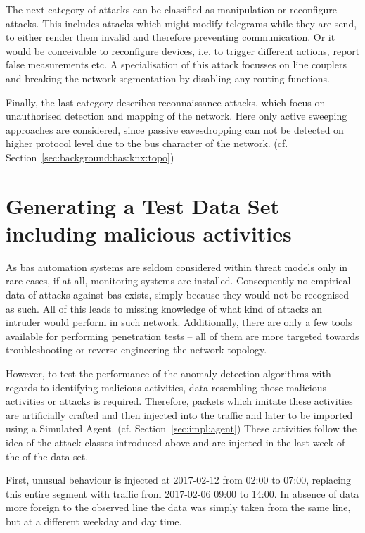 The next category of attacks can be classified as manipulation or reconfigure attacks. This includes attacks which might modify telegrams while they are send, to either render them invalid and therefore preventing communication. Or it would be conceivable to reconfigure devices, i.e. to trigger different actions, report false measurements etc. A specialisation of this attack focusses on line couplers and breaking the network segmentation by disabling any routing functions.

Finally, the last category describes reconnaissance attacks, which focus on unauthorised detection and mapping of the network. Here only active sweeping approaches are considered, since passive eavesdropping can not be detected on higher protocol level due to the bus character of the network. (cf. Section~\ref{sec:background:bas:knx:topo})



\section{Generating a Test Data Set including malicious activities}
\label{sec:methods:gen-test}

As \gls{bas} automation systems are seldom considered within threat models only in rare cases, if at all, monitoring systems are installed.
Consequently no empirical data of attacks against \gls{bas} exists, simply because they would not be recognised as such.
All of this leads to missing knowledge of what kind of attacks an intruder would perform in such network.
Additionally, there are only a few tools available for performing penetration tests -- all of them are more targeted towards troubleshooting or reverse engineering the network topology.

However, to test the performance of the anomaly detection algorithms with regards to identifying malicious activities, data resembling those malicious activities or attacks is required.
Therefore, packets which imitate these activities are artificially crafted and then injected into the traffic and later to be imported using a Simulated Agent. (cf. Section~\ref{sec:impl:agent})
These activities follow the idea of the attack classes introduced above and are injected in the last week of the of the data set.

First, unusual behaviour is injected at 2017-02-12 from 02:00 to 07:00, replacing this entire segment with traffic from 2017-02-06 09:00 to 14:00. In absence of data more foreign to the observed line the data was simply taken from the same line, but at a different weekday and day time.

